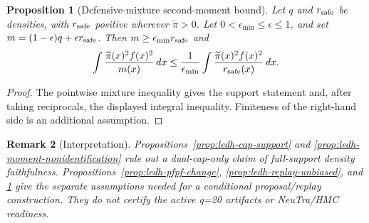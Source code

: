 \documentclass[11pt]{article}
\newtheorem{proposition}{Proposition}
\newtheorem{remark}[proposition]{Remark}
\begin{document}
\begin{proposition}[Defensive-mixture second-moment bound]
\label{prop:ledh-defensive-bound}
Let $q$ and $r_{\rm safe}$ be densities, with $r_{\rm safe}$ positive wherever
$\widetilde\pi>0$. Let $0<\epsilon_{\min}\leq\epsilon\leq1$, and set
$m=(1-\epsilon)q+\epsilon r_{\rm safe}$.  Then $m\geq
\epsilon_{\min}r_{\rm safe}$ and
\[
 \int\frac{\widetilde\pi(x)^2 f(x)^2}{m(x)}\,dx
 \leq\frac1{\epsilon_{\min}}
 \int\frac{\widetilde\pi(x)^2 f(x)^2}{r_{\rm safe}(x)}\,dx.
\]
\end{proposition}
\begin{proof}
The pointwise mixture inequality gives the support statement and, after taking
reciprocals, the displayed integral inequality.  Finiteness of the
right-hand side is an additional assumption.
\end{proof}

\begin{remark}[Interpretation]
Propositions~\ref{prop:ledh-cap-support} and
\ref{prop:ledh-moment-nonidentification} rule out a dual-cap-only claim of
full-support density faithfulness.  Propositions~\ref{prop:ledh-pfpf-change},
\ref{prop:ledh-replay-unbiased}, and
\ref{prop:ledh-defensive-bound} give the separate assumptions needed for a
conditional proposal/replay construction.  They do not certify the active
q=20 artifacts or NeuTra/HMC readiness.
\end{remark}
\end{document}
